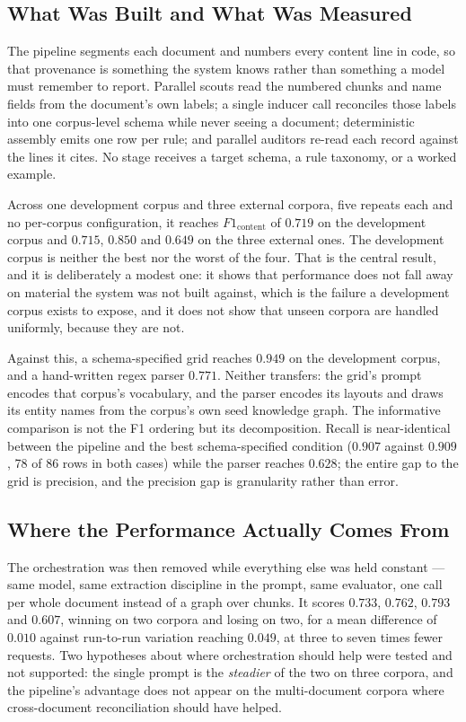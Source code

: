 \documentclass[11pt]{article}
\begin{document}
\subsection{What Was Built and What Was Measured}
The pipeline segments each document and numbers every content line in code, so
that provenance is something the system knows rather than something a model must
remember to report. Parallel scouts read the numbered chunks and name fields from
the document's own labels; a single inducer call reconciles those labels into one
corpus-level schema while never seeing a document; deterministic assembly emits
one row per rule; and parallel auditors re-read each record against the lines it
cites. No stage receives a target schema, a rule taxonomy, or a worked example.

Across one development corpus and three external corpora, five repeats each and
no per-corpus configuration, it reaches $F1_{\text{content}}$ of $0.719$ on the
development corpus and $0.715$, $0.850$ and $0.649$ on the three external ones.
The development corpus is neither the best nor the worst of the four. That is the
central result, and it is deliberately a modest one: it shows that performance
does not fall away on material the system was not built against, which is the
failure a development corpus exists to expose, and it does not show that unseen
corpora are handled uniformly, because they are not.

Against this, a schema-specified grid reaches $0.949$ on the development corpus,
and a hand-written regex parser $0.771$. Neither transfers: the grid's prompt
encodes that corpus's vocabulary, and the parser encodes its layouts and draws
its entity names from the corpus's own seed knowledge graph. The
informative comparison is not the F1 ordering but its decomposition. Recall is
near-identical between the pipeline and the best schema-specified condition
($0.907$ against $0.909$, 78 of 86 rows in both cases) while the parser reaches
$0.628$; the entire gap to the grid is precision, and the precision gap is
granularity rather than error.

\subsection{Where the Performance Actually Comes From}
The orchestration was then removed while everything else was held constant ---
same model, same extraction discipline in the prompt, same evaluator, one call
per whole document instead of a graph over chunks. It scores $0.733$, $0.762$,
$0.793$ and $0.607$, winning on two corpora and losing on two, for a mean
difference of $0.010$ against run-to-run variation reaching $0.049$, at three to
seven times fewer requests. Two hypotheses about where orchestration should help
were tested and not supported: the single prompt is the \emph{steadier} of the
two on three corpora, and the pipeline's advantage does not appear on the
multi-document corpora where cross-document reconciliation should have helped.
\end{document}
